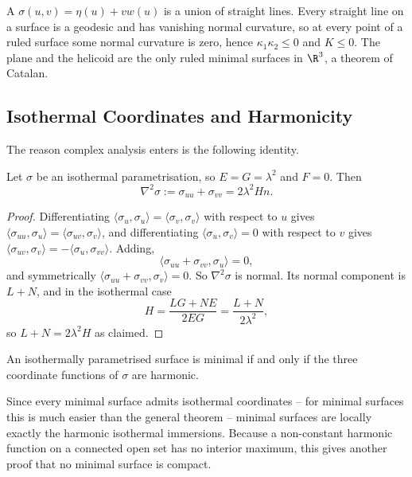 \begin{example}
    A  $\sigma(u,v) = \eta(u) + v w(u)$ is a union of straight lines. Every straight line on a surface is a geodesic and has vanishing normal curvature, so at every point of a ruled surface some normal curvature is zero, hence $\kappa_1\kappa_2 \leq 0$ and $K \leq 0$. The plane and the helicoid are the only ruled minimal surfaces in $\R^3$, a theorem of Catalan.
\end{example}

\subsection{Isothermal Coordinates and Harmonicity}

The reason complex analysis enters is the following identity.

\begin{proposition}
    Let $\sigma$ be an isothermal parametrisation, so $E = G = \lambda^2$ and $F = 0$. Then
    $$
    \nabla^2 \sigma := \sigma_{uu} + \sigma_{vv} = 2\lambda^2 H n.
    $$
\end{proposition}
\begin{proof}
    Differentiating $\langle\sigma_u,\sigma_u\rangle = \langle\sigma_v,\sigma_v\rangle$ with respect to $u$ gives $\langle \sigma_{uu},\sigma_u\rangle = \langle\sigma_{uv},\sigma_v\rangle$, and differentiating $\langle\sigma_u,\sigma_v\rangle = 0$ with respect to $v$ gives $\langle\sigma_{uv},\sigma_v\rangle = -\langle\sigma_u,\sigma_{vv}\rangle$. Adding,
    $$
    \langle \sigma_{uu}+\sigma_{vv}, \sigma_u\rangle = 0,
    $$
    and symmetrically $\langle \sigma_{uu}+\sigma_{vv},\sigma_v\rangle = 0$. So $\nabla^2\sigma$ is normal. Its normal component is $L + N$, and in the isothermal case
    $$
    H = \frac{LG + NE}{2EG} = \frac{L+N}{2\lambda^2},
    $$
    so $L + N = 2\lambda^2 H$ as claimed.
\end{proof}

\begin{corollary}
    An isothermally parametrised surface is minimal if and only if the three coordinate functions of $\sigma$ are harmonic.
\end{corollary}

Since every minimal surface admits isothermal coordinates -- for minimal surfaces this is much easier than the general theorem -- minimal surfaces are locally exactly the harmonic isothermal immersions. Because a non-constant harmonic function on a connected open set has no interior maximum, this gives another proof that no minimal surface is compact.

